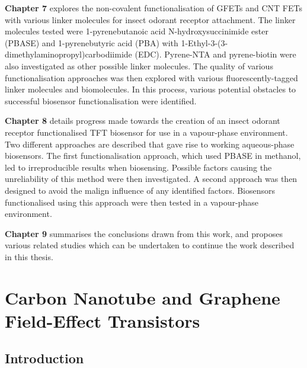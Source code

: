 \documentclass[
  a4paper,
]{scrbook}
\begin{document}
\textbf{Chapter 7} explores the non-covalent functionalisation of GFETs
and CNT FETs with various linker molecules for insect odorant receptor
attachment. The linker molecules tested were 1-pyrenebutanoic acid
N-hydroxysuccinimide ester (PBASE) and 1-pyrenebutyric acid (PBA) with
1-Ethyl-3-(3-dimethylaminopropyl)carbodiimide (EDC). Pyrene-NTA and
pyrene-biotin were also investigated as other possible linker molecules.
The quality of various functionalisation approaches was then explored
with various fluorescently-tagged linker molecules and biomolecules. In
this process, various potential obstacles to successful biosensor
functionalisation were identified.

\textbf{Chapter 8} details progress made towards the creation of an
insect odorant receptor functionalised TFT biosensor for use in a
vapour-phase environment. Two different approaches are described that
gave rise to working aqueous-phase biosensors. The first
functionalisation approach, which used PBASE in methanol, led to
irreproducible results when biosensing. Possible factors causing the
unreliability of this method were then investigated. A second approach
was then designed to avoid the malign influence of any identified
factors. Biosensors functionalised using this approach were then tested
in a vapour-phase environment.

\textbf{Chapter 9} summarises the conclusions drawn from this work, and
proposes various related studies which can be undertaken to continue the
work described in this thesis.


\hypertarget{sec-thin-film-transistors}{%
\chapter{Carbon Nanotube and Graphene Field-Effect
Transistors}\label{sec-thin-film-transistors}}

\hypertarget{introduction-1}{%
\section{Introduction}\label{introduction-1}}
\end{document}

